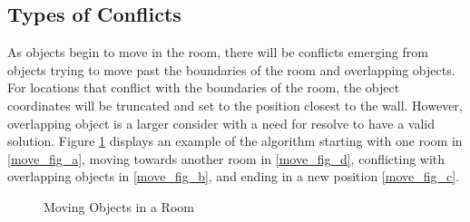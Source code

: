 \documentclass[conference]{IEEEtran}
\begin{document}
    \subsection{Types of Conflicts}
    As objects begin to move in the room, there will be conflicts emerging from objects trying to move past the boundaries of the room and overlapping objects. For locations that conflict with the boundaries of the room, the object coordinates will be truncated and set to the position closest to the wall. However, overlapping object is a larger consider with a need for resolve to have a valid solution. Figure \ref{move_fig} displays an example of the algorithm starting with one room in \ref{move_fig_a}, moving towards another room in \ref{move_fig_d}, conflicting with overlapping objects in \ref{move_fig_b}, and ending in a new position \ref{move_fig_c}.
        \begin{figure}[!h]
        \centering
        \hfill
        \caption{Moving Objects in a Room}
        \label{move_fig}
    \end{figure}
    
\end{document}
